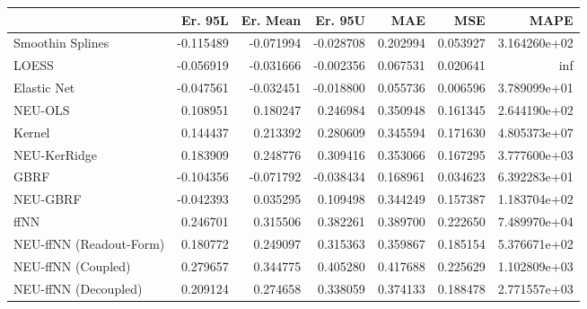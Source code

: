 \begin{tabular}{lrrrrrr}
\toprule
{} &   Er. 95L &  Er. Mean &   Er. 95U &       MAE &       MSE &          MAPE \\
\midrule
Smoothin Splines        & -0.115489 & -0.071994 & -0.028708 &  0.202994 &  0.053927 &  3.164260e+02 \\
LOESS                   & -0.056919 & -0.031666 & -0.002356 &  0.067531 &  0.020641 &           inf \\
Elastic Net             & -0.047561 & -0.032451 & -0.018800 &  0.055736 &  0.006596 &  3.789099e+01 \\
NEU-OLS                 &  0.108951 &  0.180247 &  0.246984 &  0.350948 &  0.161345 &  2.644190e+02 \\
Kernel                  &  0.144437 &  0.213392 &  0.280609 &  0.345594 &  0.171630 &  4.805373e+07 \\
NEU-KerRidge            &  0.183909 &  0.248776 &  0.309416 &  0.353066 &  0.167295 &  3.777600e+03 \\
GBRF                    & -0.104356 & -0.071792 & -0.038434 &  0.168961 &  0.034623 &  6.392283e+01 \\
NEU-GBRF                & -0.042393 &  0.035295 &  0.109498 &  0.344249 &  0.157387 &  1.183704e+02 \\
ffNN                    &  0.246701 &  0.315506 &  0.382261 &  0.389700 &  0.222650 &  7.489970e+04 \\
NEU-ffNN (Readout-Form) &  0.180772 &  0.249097 &  0.315363 &  0.359867 &  0.185154 &  5.376671e+02 \\
NEU-ffNN (Coupled)      &  0.279657 &  0.344775 &  0.405280 &  0.417688 &  0.225629 &  1.102809e+03 \\
NEU-ffNN (Decoupled)    &  0.209124 &  0.274658 &  0.338059 &  0.374133 &  0.188478 &  2.771557e+03 \\
\bottomrule
\end{tabular}
